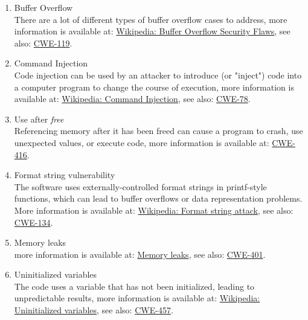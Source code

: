       \begin{enumerate}
         \item Buffer Overflow \\
               There are a lot of different types of buffer overflow cases to address,
               more information is available at:
               \href{http://en.wikipedia.org/wiki/Buffer_overflow}{Wikipedia: Buffer Overflow Security Flaws},
               see also:
               \href{http://cwe.mitre.org/data/definitions/119.html}{CWE-119}.

         \item Command Injection \\
               Code injection can be used by an attacker to introduce (or "inject") code
               into a computer program to change the course of execution, more information
               is available at:
               \href{http://en.wikipedia.org/wiki/Command_injection}{Wikipedia: Command Injection},
               see also:
               \href{http://cwe.mitre.org/data/definitions/78.html}{CWE-78}.

         \item Use after {\em free} \\
               Referencing memory after it has been freed can cause a program to crash,
               use unexpected values, or execute code, more information is available at:
               \href{http://cwe.mitre.org/data/definitions/416.html}{CWE-416}.

         \item Format string vulnerability \\
               The software uses externally-controlled format strings in printf-style
               functions, which can lead to buffer overflows or data representation
               problems. More information is available at:
               \href{http://en.wikipedia.org/wiki/Format_string_vulnerabilities}{Wikipedia: Format string attack}, 
               see also:
               \href{http://cwe.mitre.org/data/definitions/134.html}{CWE-134}.

         \item Memory leaks \\
               more information is available at:
               \href{http://en.wikipedia.org/wiki/Memory_leak}{Memory leaks}, 
               see also:
               \href{http://cwe.mitre.org/data/definitions/401.html}{CWE-401}.

         \item Uninitialized variables \\
               The code uses a variable that has not been initialized, leading to
               unpredictable results, more information is available at:
               \href{http://en.wikipedia.org/wiki/Uninitialized_variable}{Wikipedia: Uninitialized variables}, 
               see also:
               \href{http://cwe.mitre.org/data/definitions/457.html}{CWE-457}.


\end{enumerate}
